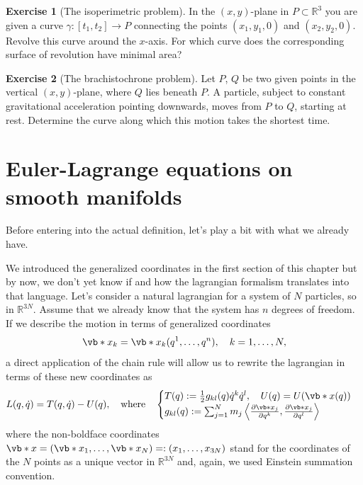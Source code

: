 \documentclass[english,fontsize=11pt,paper=b5]{scrbook}
\numberwithin{equation}{chapter}
\theoremstyle{definition}
\newtheorem{exercise}{Exercise}[chapter]
\begin{document}
    \begin{exercise}[The isoperimetric problem]
      In the $(x,y)$-plane in $P\subset \mathbb{R}^3$ you are given a curve $\gamma:[t_1,t_2]\to P$ connecting the points $(x_1, y_1, 0)$ and $(x_2, y_2, 0)$. Revolve this curve around the $x$-axis.
      For which curve does the corresponding surface of revolution have minimal area?
    \end{exercise}

    \begin{exercise}[The brachistochrone problem]
      Let $P$, $Q$ be two given points in the vertical $(x,y)$-plane, where $Q$ lies beneath $P$.
      A particle, subject to constant gravitational acceleration pointing downwards, moves from $P$ to $Q$, starting at rest.
      Determine the curve along which this motion takes the shortest time.
    \end{exercise}

    \section{Euler-Lagrange equations on smooth manifolds}\label{sec:lagrangianonmanifold}

    Before entering into the actual definition, let's play a bit with what we already have.

    We introduced the generalized coordinates in the first section of this chapter but by now, we don't yet know if and how the lagrangian formalism translates into that language.
    Let's consider a natural lagrangian for a system of $N$ particles, so in $\mathbb{R}^{3N}$.
    Assume that we already know that the system has $n$ degrees of freedom.
    If we describe the motion in terms of generalized coordinates
    \begin{equation}
      \vb*{x}_k = \vb*{x}_k(q^1, \ldots, q^{n}), \quad k=1,\ldots,N,
    \end{equation}
    a direct application of the chain rule will allow us to rewrite the lagrangian in terms of these new coordinates as
    \begin{equation}
      L(q, \dot q) = T(q, \dot q) - U(q),
      \quad\mbox{where}\quad
      \begin{cases}
        T(q):= \frac12 g_{kl}(q)\dot q^k \dot q^l, \quad U(q) = U(\vb*{x}(q)) \\
        g_{kl} (q) := \sum_{j=1}^{N} m_{j} \left\langle\frac{\partial \vb*{x}_j}{\partial q^k}, \frac{\partial \vb*{x}_j}{\partial q^l}\right\rangle
      \end{cases}
    \end{equation}
    where the non-boldface coordinates $\vb*{x} = (\vb*{x}_1, \ldots, \vb*{x}_N) =: (x_1, \ldots, x_{3N})$ stand for the coordinates of the $N$ points as a unique vector in $\mathbb{R}^{3N}$ and, again, we used Einstein summation convention.
\end{document}
